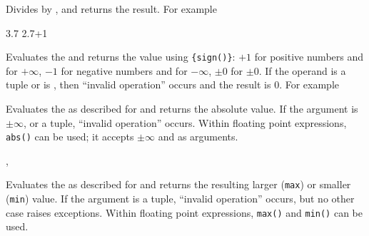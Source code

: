 \documentclass[oneside]{book}
\begin{document}
\begin{function}{\FpMathDiv}
\begin{syntax}
  
\end{syntax}
Divides  by ,
and returns the result. For example
\begin{demohigh}
 {3.7}
 {2.7+1}
\end{demohigh}
\end{function}

\begin{function}{\FpMathSign}
\begin{syntax}
 
\end{syntax}
Evaluates the  and returns the value
using \verb|{sign(|\verb|)}|: $+1$ for positive
numbers and for $+\infty$, $-1$ for negative numbers and for
$-\infty$, $\pm 0$ for $\pm 0$.  If the operand is a tuple or is
\nan{}, then \enquote{invalid operation} occurs and the result
is $0$. For example
\begin{demohigh}
\end{demohigh}
\end{function}

\begin{function}{\FpMathAbs}
\begin{syntax}
 
\end{syntax}
Evaluates the  as described for
 and returns the absolute value.
If the argument is $\pm\infty$, \nan{} or a tuple,
\enquote{invalid operation} occurs.  Within floating point
expressions, \verb|abs()| can be used; it accepts $\pm\infty$ and \nan{}
as arguments.
\end{function}

\begin{function}{\FpMathMax,\FpMathMin}
\begin{syntax}
  
  
\end{syntax}
Evaluates the  as described for 
and returns the resulting larger (\texttt{max}) or smaller (\texttt{min}) value.
If the argument is a tuple, \enquote{invalid operation} occurs,
but no other case raises exceptions. Within floating point expressions,
\verb|max()| and \verb|min()| can be used.
\end{function}
\end{document}
